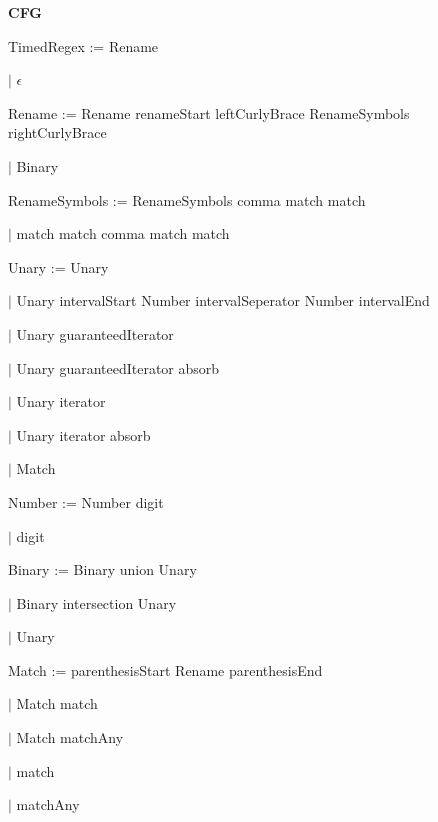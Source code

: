
\textbf{CFG}

TimedRegex := Rename

\qquad	$\mid$ $\epsilon$

Rename := Rename renameStart leftCurlyBrace RenameSymbols rightCurlyBrace

\qquad $\mid$ Binary

RenameSymbols := RenameSymbols comma match match

\qquad $\mid$ match match comma match match

Unary := Unary

\qquad $\mid$ Unary intervalStart Number intervalSeperator Number intervalEnd

\qquad $\mid$ Unary guaranteedIterator

\qquad $\mid$ Unary guaranteedIterator absorb

\qquad $\mid$ Unary iterator

\qquad $\mid$ Unary iterator absorb

\qquad $\mid$ Match

Number := Number digit

\qquad $\mid$ digit

Binary := Binary union Unary

\qquad $\mid$ Binary intersection Unary

\qquad $\mid$ Unary

Match := parenthesisStart Rename parenthesisEnd

\qquad $\mid$ Match match

\qquad $\mid$ Match matchAny

\qquad $\mid$ match

\qquad $\mid$ matchAny

